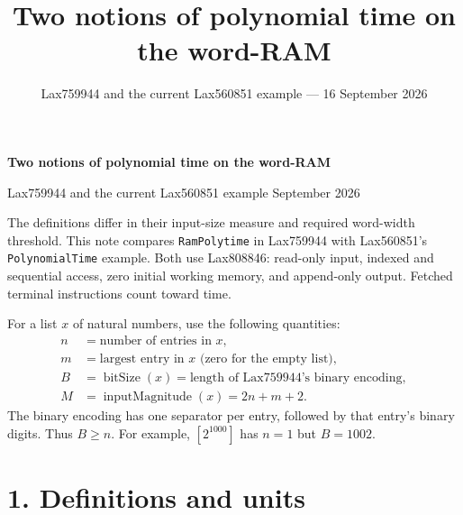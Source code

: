\documentclass[11pt,a4paper]{article}
\title{Two notions of polynomial time on the word-RAM}
\author{}
\date{Lax759944 and the current Lax560851 example --- 16 September 2026}
\newcommand{\code}[1]{\texttt{#1}}
\newcommand{\bits}{\operatorname{bitSize}}
\begin{document}
\begin{center}
  {\Large\bfseries Two notions of polynomial time on the word-RAM}\par
  {\small Lax759944 and the current Lax560851 example\enspace\textbullet{} September 2026}
\end{center}

The definitions differ in their input-size measure and required word-width
threshold. This note compares \code{RamPolytime} in Lax759944 with Lax560851's
\code{PolynomialTime} example. Both use Lax808846: read-only input, indexed
and sequential access, zero initial working memory, and append-only output.
Fetched terminal instructions count toward time.

For a list $x$ of natural numbers, use the following quantities:
\[
\begin{aligned}
  n &= \text{number of entries in }x,\\[3pt]
  m &= \text{largest entry in }x\text{ (zero for the empty list)},\\[3pt]
  B &= \bits(x)=\text{length of Lax759944's binary encoding},\\[3pt]
  M &= \operatorname{inputMagnitude}(x)=2n+m+2.
\end{aligned}
\]
The binary encoding has one separator per entry, followed by that entry's
binary digits. Thus $B\ge n$. For example, $[2^{1000}]$ has $n=1$ but $B=1002$.

\section*{1. Definitions and units}
\end{document}
